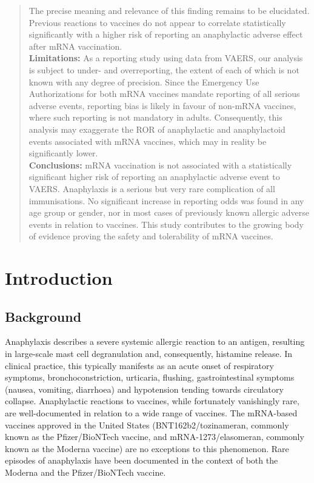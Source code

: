 \documentclass{article}
\begin{document}
\begin{abstract}
        The precise meaning and relevance of this finding remains to be elucidated.
        Previous reactions to vaccines do not appear to correlate statistically significantly with a higher risk of reporting an anaphylactic adverse effect after mRNA vaccination. \\
    \textbf{Limitations:}
        As a reporting study using data from VAERS, our analysis is subject to under- and overreporting, the extent of each of which is not known with any degree of precision.
        Since the Emergency Use Authorizations for both mRNA vaccines mandate reporting of all serious adverse events, reporting bias is likely in favour of non-mRNA vaccines, where such reporting is not mandatory in adults.
        Consequently, this analysis may exaggerate the ROR of anaphylactic and anaphylactoid events associated with mRNA vaccines, which may in reality be significantly lower. \\
    \textbf{Conclusions:}
        mRNA vaccination is not associated with a statistically significant higher risk of reporting an anaphylactic adverse event to VAERS.
        Anaphylaxis is a serious but very rare complication of all immunisations.
        No significant increase in reporting odds was found in any age group or gender, nor in most cases of previously known allergic adverse events in relation to vaccines.
        This study contributes to the growing body of evidence proving the safety and tolerability of mRNA vaccines.
\end{abstract}

\section{Introduction}

\subsection{Background}

Anaphylaxis describes a severe systemic allergic reaction to an antigen, resulting in large-scale mast cell degranulation and, consequently, histamine release.\cite{metcalfe2009mechanisms}
In clinical practice, this typically manifests as an acute onset of respiratory symptoms, bronchoconstriction, urticaria, flushing, gastrointestinal symptoms (nausea, vomiting, diarrhoea) and hypotension tending towards circulatory collapse.\cite{lee2011anaphylaxis}
Anaphylactic reactions to vaccines, while fortunately vanishingly rare, are well-documented in relation to a wide range of vaccines.\cite{su2019anaphylaxis,kelso1999anaphylaxis,kelso1993anaphylaxis,nagao2016highly}
The mRNA-based vaccines approved in the United States (BNT162b2/tozinameran, commonly known as the Pfizer/BioNTech vaccine, and mRNA-1273/elasomeran, commonly known as the Moderna vaccine) are no exceptions to this phenomenon.
Rare episodes of anaphylaxis have been documented in the context of both the Moderna\cite{covid2021allergicmoderna} and the Pfizer/BioNTech vaccine.\cite{shimabukuro2021allergic}
\end{document}
